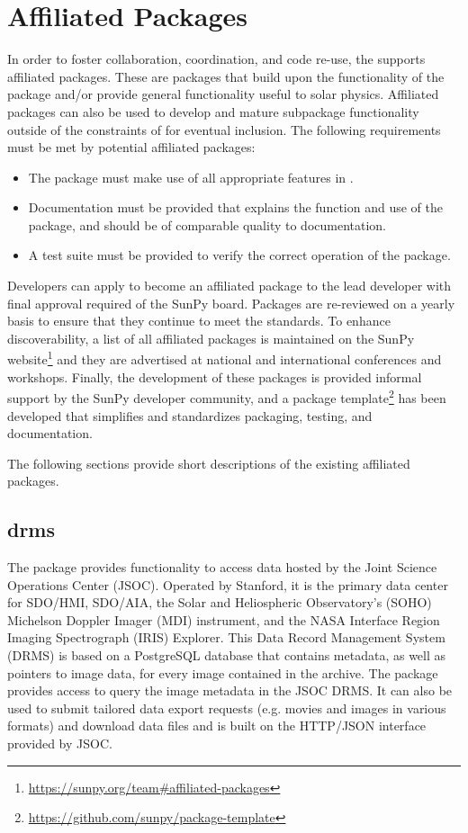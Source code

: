 \section{Affiliated Packages}
\label{sec:affil_package}

In order to foster collaboration, coordination, and code re-use, the \sunpyproj supports affiliated packages.
These are \python packages that build upon the functionality of the \sunpypkg package and/or provide general functionality useful to solar physics.
Affiliated packages can also be used to develop and mature subpackage functionality outside of the constraints of \sunpypkg for eventual inclusion.
The following requirements must be met by potential affiliated packages:
\begin{itemize}
    \item The package must make use of all appropriate features in \sunpypkg.
    \item Documentation must be provided that explains the function and use of the package, and should be of comparable quality to \sunpypkg documentation.
    \item A test suite must be provided to verify the correct operation of the package.
\end{itemize}
Developers can apply to become an affiliated package to the lead developer with final approval required of the SunPy board.
Packages are re-reviewed on a yearly basis to ensure that they continue to meet the standards.
To enhance discoverability, a list of all affiliated packages is maintained on the SunPy website\footnote{\url{https://sunpy.org/team\#affiliated-packages}} and they are advertised at national and international conferences and workshops.
Finally, the development of these packages is provided informal support by the SunPy developer community, and
a package template\footnote{\url{https://github.com/sunpy/package-template}} has been developed that simplifies and standardizes packaging, testing, and documentation.

The following sections provide short descriptions of the existing affiliated packages.

\subsection{drms}
\label{sec:drms}

The  package provides functionality to access data hosted by the Joint Science Operations Center (JSOC).
Operated by Stanford, it is the primary data center for SDO/HMI, SDO/AIA, the Solar and Heliospheric Observatory's (SOHO) Michelson Doppler Imager (MDI) instrument, and the NASA Interface Region Imaging Spectrograph (IRIS) Explorer.
This Data Record Management System (DRMS) is based on a PostgreSQL database that contains metadata, as well as pointers to image data, for every image contained in the archive.
The  package provides access to query the image metadata in the JSOC DRMS. It can also be used to submit tailored data export requests (e.g. movies and images in various formats) and download data files and is built on the HTTP/JSON interface provided by JSOC.

